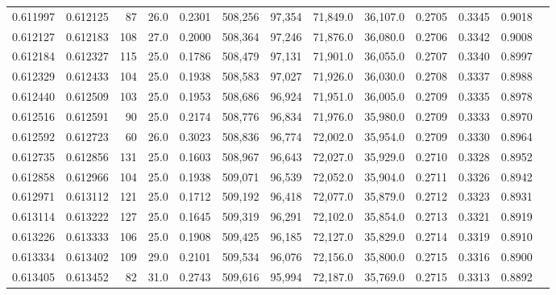 \begin{tabular}{rrrrrrrrrrrrr}
0.611997 & 0.612125 &    87 & 26.0 &                                     0.2301 & 508,256 &  97,354 &  71,849.0 &  36,107.0 & 0.2705 & 0.3345 & 0.9018 \\
0.612127 & 0.612183 &   108 & 27.0 &                                     0.2000 & 508,364 &  97,246 &  71,876.0 &  36,080.0 & 0.2706 & 0.3342 & 0.9008 \\
0.612184 & 0.612327 &   115 & 25.0 &                                     0.1786 & 508,479 &  97,131 &  71,901.0 &  36,055.0 & 0.2707 & 0.3340 & 0.8997 \\
0.612329 & 0.612433 &   104 & 25.0 &                                     0.1938 & 508,583 &  97,027 &  71,926.0 &  36,030.0 & 0.2708 & 0.3337 & 0.8988 \\
0.612440 & 0.612509 &   103 & 25.0 &                                     0.1953 & 508,686 &  96,924 &  71,951.0 &  36,005.0 & 0.2709 & 0.3335 & 0.8978 \\
0.612516 & 0.612591 &    90 & 25.0 &                                     0.2174 & 508,776 &  96,834 &  71,976.0 &  35,980.0 & 0.2709 & 0.3333 & 0.8970 \\
0.612592 & 0.612723 &    60 & 26.0 &                                     0.3023 & 508,836 &  96,774 &  72,002.0 &  35,954.0 & 0.2709 & 0.3330 & 0.8964 \\
0.612735 & 0.612856 &   131 & 25.0 &                                     0.1603 & 508,967 &  96,643 &  72,027.0 &  35,929.0 & 0.2710 & 0.3328 & 0.8952 \\
0.612858 & 0.612966 &   104 & 25.0 &                                     0.1938 & 509,071 &  96,539 &  72,052.0 &  35,904.0 & 0.2711 & 0.3326 & 0.8942 \\
0.612971 & 0.613112 &   121 & 25.0 &                                     0.1712 & 509,192 &  96,418 &  72,077.0 &  35,879.0 & 0.2712 & 0.3323 & 0.8931 \\
0.613114 & 0.613222 &   127 & 25.0 &                                     0.1645 & 509,319 &  96,291 &  72,102.0 &  35,854.0 & 0.2713 & 0.3321 & 0.8919 \\
0.613226 & 0.613333 &   106 & 25.0 &                                     0.1908 & 509,425 &  96,185 &  72,127.0 &  35,829.0 & 0.2714 & 0.3319 & 0.8910 \\
0.613334 & 0.613402 &   109 & 29.0 &                                     0.2101 & 509,534 &  96,076 &  72,156.0 &  35,800.0 & 0.2715 & 0.3316 & 0.8900 \\
0.613405 & 0.613452 &    82 & 31.0 &                                     0.2743 & 509,616 &  95,994 &  72,187.0 &  35,769.0 & 0.2715 & 0.3313 & 0.8892 \\

\end{tabular}

